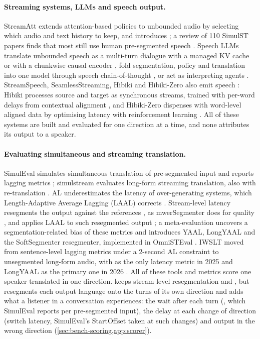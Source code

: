 \paragraph{Streaming systems, LLMs and speech output.}
StreamAtt extends attention-based policies to unbounded audio by selecting which audio and text history to keep, and introduces \laal \citep{papi2024streamatt}; a review of 110 SimulST papers finds that most still use human pre-segmented speech \citep{papi2025how}. Speech LLMs translate unbounded speech as a multi-turn dialogue with a managed KV cache \citep{ouyang2025infinisst} or with a chunkwise causal encoder \citep{ouyang2025cmu}, fold segmentation, policy and translation into one model through speech chain-of-thought \citep{guo2025streamuni}, or act as interpreting agents \citep{cheng2024towards}. StreamSpeech, SeamlessStreaming, Hibiki and Hibiki-Zero also emit speech \citep{zhang2024streamspeech,seamless2023seamless,labiausse2025highfidelity,labiausse2026simultaneous}: Hibiki processes source and target as synchronous streams, trained with per-word delays from contextual alignment \citep{labiausse2025highfidelity}, and Hibiki-Zero dispenses with word-level aligned data by optimising latency with reinforcement learning \citep{labiausse2026simultaneous}. All of these systems are built and evaluated for one direction at a time, and none attributes its output to a speaker.

\paragraph{Evaluating simultaneous and streaming translation.}
SimulEval simulates simultaneous translation of pre-segmented input and reports lagging metrics \citep{ma2020simuleval}; simulstream evaluates long-form streaming translation, also with re-translation \citep{gaido2025simulstream}. AL underestimates the latency of over-generating systems, which Length-Adaptive Average Lagging (LAAL) corrects \citep{papi2022overgeneration}. Stream-level latency resegments the output against the references \citep{iranzosanchez2021stream}, as mwerSegmenter does for quality \citep{matusov2005evaluating}, and \laal applies LAAL to such resegmented output \citep{papi2024streamatt}; a meta-evaluation uncovers a segmentation-related bias of these metrics and introduces YAAL, LongYAAL and the SoftSegmenter resegmenter, implemented in OmniSTEval \citep{polak2025better}. IWSLT moved from sentence-level lagging metrics under a 2-second AL constraint \citep{ahmad2024findings} to unsegmented long-form audio, with \laal as the only latency metric in 2025 \citep{abdulmumin2025findings} and LongYAAL as the primary one in 2026 \citep{adelani2026speech}. All of these tools and metrics score one speaker translated in one direction. \scorer keeps stream-level resegmentation and \laal, but resegments each output language onto the turns of its own direction and adds what a listener in a conversation experiences: the wait after each turn (\eo, which SimulEval reports per pre-segmented input), the delay at each change of direction (switch latency, SimulEval's StartOffset taken at such changes) and output in the wrong direction (\cref{sec:bench-scoring,app:scorer}).

